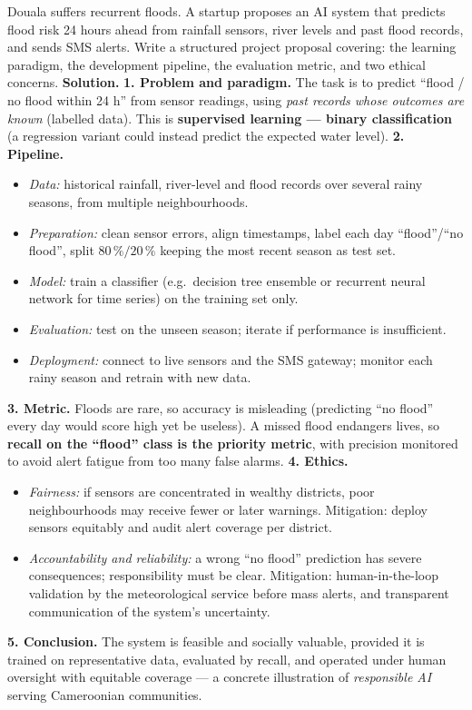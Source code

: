 \documentclass[11pt]{article}
\begin{document}
\begin{exoresolu}
Douala suffers recurrent floods. A startup proposes an AI system that predicts flood risk 24 hours ahead from rainfall sensors, river levels and past flood records, and sends SMS alerts. Write a structured project proposal covering: the learning paradigm, the development pipeline, the evaluation metric, and two ethical concerns.
\tcblower
\textbf{Solution.}
\textbf{1. Problem and paradigm.} The task is to predict ``flood / no flood within 24 h'' from sensor readings, using \emph{past records whose outcomes are known} (labelled data). This is \textbf{supervised learning — binary classification} (a regression variant could instead predict the expected water level).
\textbf{2. Pipeline.}
\begin{itemize}
\item \emph{Data:} historical rainfall, river-level and flood records over several rainy seasons, from multiple neighbourhoods.
\item \emph{Preparation:} clean sensor errors, align timestamps, label each day ``flood''/``no flood'', split $80\,\%/20\,\%$ keeping the most recent season as test set.
\item \emph{Model:} train a classifier (e.g.\ decision tree ensemble or recurrent neural network for time series) on the training set only.
\item \emph{Evaluation:} test on the unseen season; iterate if performance is insufficient.
\item \emph{Deployment:} connect to live sensors and the SMS gateway; monitor each rainy season and retrain with new data.
\end{itemize}
\textbf{3. Metric.} Floods are rare, so accuracy is misleading (predicting ``no flood'' every day would score high yet be useless). A missed flood endangers lives, so \textbf{recall on the ``flood'' class is the priority metric}, with precision monitored to avoid alert fatigue from too many false alarms.
\textbf{4. Ethics.}
\begin{itemize}
\item \emph{Fairness:} if sensors are concentrated in wealthy districts, poor neighbourhoods may receive fewer or later warnings. Mitigation: deploy sensors equitably and audit alert coverage per district.
\item \emph{Accountability and reliability:} a wrong ``no flood'' prediction has severe consequences; responsibility must be clear. Mitigation: human-in-the-loop validation by the meteorological service before mass alerts, and transparent communication of the system's uncertainty.
\end{itemize}
\textbf{5. Conclusion.} The system is feasible and socially valuable, provided it is trained on representative data, evaluated by recall, and operated under human oversight with equitable coverage — a concrete illustration of \emph{responsible AI} serving Cameroonian communities.
\end{exoresolu}
\end{document}
